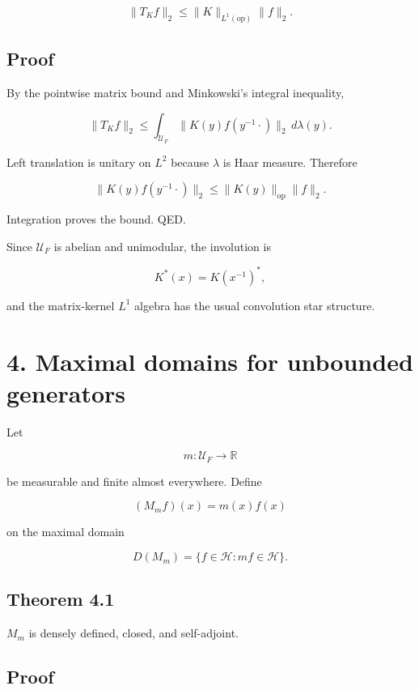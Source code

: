 \[
\boxed{
\|T_Kf\|_2
\le
\|K\|_{L^1(\mathrm{op})}\|f\|_2.
}
\]

\hypertarget{proof-1}{%
\subsection{Proof}\label{proof-1}}

By the pointwise matrix bound and Minkowski's integral inequality,

\[
\|T_Kf\|_2
\le
\int_{\mathcal U_F}
\|K(y)f(y^{-1}\cdot)\|_2\,d\lambda(y).
\]

Left translation is unitary on \(L^2\) because \(\lambda\) is Haar measure.
Therefore

\[
\|K(y)f(y^{-1}\cdot)\|_2
\le
\|K(y)\|_{\mathrm{op}}\|f\|_2.
\]

Integration proves the bound. QED.

Since \(\mathcal U_F\) is abelian and unimodular, the involution is

\[
K^*(x)=K(x^{-1})^*,
\]

and the matrix-kernel \(L^1\) algebra has the usual convolution star structure.

\hypertarget{maximal-domains-for-unbounded-generators}{%
\section{4. Maximal domains for unbounded generators}\label{maximal-domains-for-unbounded-generators}}

Let

\[
m:\mathcal U_F\to\mathbb R
\]

be measurable and finite almost everywhere. Define

\[
(M_mf)(x)=m(x)f(x)
\]

on the maximal domain

\[
D(M_m)
=
\{f\in\mathcal H:m f\in\mathcal H\}.
\]

\hypertarget{theorem-4.1}{%
\subsection{Theorem 4.1}\label{theorem-4.1}}

\(M_m\) is densely defined, closed, and self-adjoint.

\hypertarget{proof-2}{%
\subsection{Proof}\label{proof-2}}

